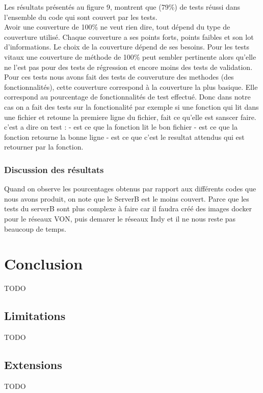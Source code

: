 \documentclass[12pt, openany]{report}
\begin{document}
\begin{flushleft}
Les résultats présentés au figure 9, montrent que (79\%) de tests réussi dans l'ensemble du code qui sont couvert par les tests. \\
Avoir une couverture de 100\% ne veut rien dire, tout dépend du type de couverture utilisé. Chaque couverture a ses points forts, points faibles et son lot d’informations.
Le choix de la couverture dépend de ses besoins.
Pour les tests vitaux une couverture de méthode de 100\% peut sembler pertinente alors qu’elle ne l’est pas pour des tests de régression et encore moins des tests de validation. Pour ces tests
nous avons fait des tests de couveruture des methodes (des fonctionnalités), cette couverture correspond à la couverture la plus basique. Elle correspond au pourcentage de fonctionnalités  de test effectué.
Donc dans notre cas on a fait des tests sur la fonctionalité par exemple si une fonction qui lit dans une fichier et retoune la premiere ligne du fichier, fait ce qu'elle est sanscer faire.
c'est a dire on test : 
- est ce que la fonction lit le bon fichier
- est ce que la fonction retourne la bonne ligne
- est ce que c'est le resultat attendus qui est retourner par la fonction.

\subsubsection{Discussion des résultats}
Quand on observe les pourcentages obtenus par rapport aux différents codes que nous avons produit, on note que le ServerB est le moins couvert. Parce que les tests du serverB sont plus complexe à faire car il faudra créé des images docker pour le réseaux VON, puis demarer le réseaux Indy et il ne nous reste pas beaucoup de temps.




\end{flushleft}


\section{Conclusion}
\noindent 
\begin{flushleft}
TODO
\end{flushleft}
\subsection{Limitations}
\noindent 
\begin{flushleft}
TODO
\end{flushleft}
\subsection{Extensions}
\noindent 
\begin{flushleft}
TODO
\end{flushleft}
\end{document}
